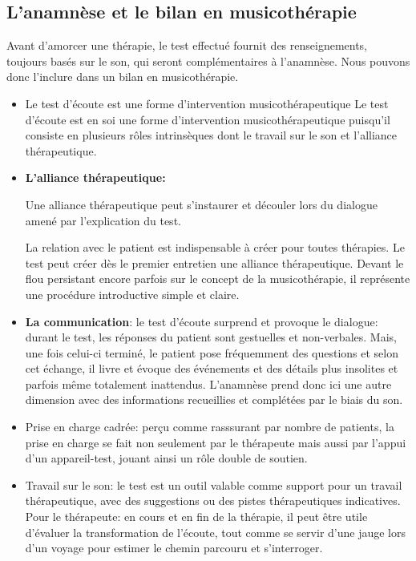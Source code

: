 \subsection{L'anamnèse et le bilan en musicothérapie}

  Avant d'amorcer une thérapie, le test effectué fournit des renseignements, toujours basés sur le son, qui seront complémentaires à l'anamnèse. Nous pouvons donc l'inclure dans un  bilan en musicothérapie.
  \begin{itemize}
    
 \item Le test d'écoute est une forme d'intervention musicothérapeutique
Le test d'écoute est en soi une forme d'intervention
 musicothérapeutique puisqu'il consiste en plusieurs rôles intrinsèques dont le travail sur le son et
 l'alliance thérapeutique.
 
\item \textbf{L'alliance thérapeutique:}
  
  Une alliance thérapeutique  peut
   s'instaurer et  découler lors du
   dialogue amené par l'explication du test.
 
La relation avec le patient est indispensable à créer pour toutes
thérapies. Le test peut créer dès le premier entretien une alliance
thérapeutique.
Devant le flou persistant  encore parfois sur le concept de la
musicothérapie, il représente une procédure introductive simple et claire.  

  \item \textbf{La communication}: le test d'écoute surprend et provoque le dialogue:
  durant le test, les réponses du patient sont
    gestuelles et 
    non-verbales. Mais, une fois celui-ci terminé,
 le patient pose fréquemment des questions et selon
 cet échange, il livre et évoque des événements et des détails plus
 insolites et parfois même totalement inattendus.
L'anamnèse prend
 donc ici une autre  dimension avec des informations recueillies et complétées
 par le biais du son.

                           
\item Prise en charge cadrée: perçu comme  rasssurant  par
  nombre de patients, la prise en charge se fait non seulement par le
  thérapeute mais aussi par l'appui d'un appareil-test, jouant ainsi
  un rôle double de soutien.
 
   
  \item Travail sur le son: le test est un outil valable comme
 support pour un travail thérapeutique, avec
 des suggestions ou des pistes thérapeutiques indicatives.
 Pour le thérapeute: en cours et en fin de la thérapie, il peut
  être utile d'évaluer la transformation de l'écoute, tout
comme se servir d'une jauge  lors d'un voyage pour estimer le chemin
parcouru et s'interroger.


\end{itemize}
